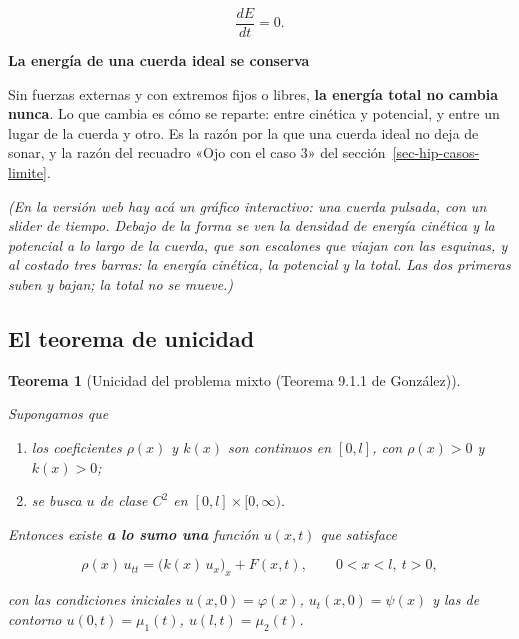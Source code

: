 \documentclass[
  spanish,
  a4paper,
]{scrbook}
\providecommand{\tightlist}{%
  \setlength{\itemsep}{0pt}\setlength{\parskip}{0pt}}
\theoremstyle{definition}
\theoremstyle{plain}
\theoremstyle{definition}
\theoremstyle{plain}
\newtheorem{theorem}{Teorema}[chapter]
\theoremstyle{definition}
\theoremstyle{remark}
\begin{document}
\[
\frac{dE}{dt} = 0 .
\]

\begin{tcolorbox}[enhanced jigsaw, arc=.35mm, bottomrule=.15mm, breakable, colback=white, colframe=quarto-callout-important-color-frame, left=2mm, leftrule=.75mm, opacityback=0, rightrule=.15mm, toprule=.15mm]
\begin{minipage}[t]{5.5mm}
\textcolor{quarto-callout-important-color}{\faExclamation}
\end{minipage}%
\begin{minipage}[t]{\textwidth - 5.5mm}

\vspace{-3mm}\textbf{La energía de una cuerda ideal se conserva}\vspace{3mm}

Sin fuerzas externas y con extremos fijos o libres, \textbf{la energía
total no cambia nunca}. Lo que cambia es cómo se reparte: entre cinética
y potencial, y entre un lugar de la cuerda y otro. Es la razón por la
que una cuerda ideal no deja de sonar, y la razón del recuadro «Ojo con
el caso 3» del sección~\ref{sec-hip-casos-limite}.

\end{minipage}%
\end{tcolorbox}

\emph{(En la versión web hay acá un gráfico interactivo: una cuerda
pulsada, con un slider de tiempo. Debajo de la forma se ven la densidad
de energía cinética y la potencial a lo largo de la cuerda, que son
escalones que viajan con las esquinas, y al costado tres barras: la
energía cinética, la potencial y la total. Las dos primeras suben y
bajan; la total no se mueve.)}

\subsection{El teorema de unicidad}\label{sec-hip-unicidad}

\begin{theorem}[Unicidad del problema mixto (Teorema 9.1.1 de
González)]\protect\hypertarget{thm-hip-unicidad}{}\label{thm-hip-unicidad}

Supongamos que

\begin{enumerate}
\def\labelenumi{\arabic{enumi}.}
\tightlist
\item
  los coeficientes \(\rho(x)\) y \(k(x)\) son continuos en \([0,l]\),
  con \(\rho(x)>0\) y \(k(x)>0\);
\item
  se busca \(u\) de clase \(C^2\) en \([0,l]\times[0,\infty)\).
\end{enumerate}

Entonces existe \textbf{a lo sumo una} función \(u(x,t)\) que satisface

\[
\rho(x)\,u_{tt} = \big(k(x)\,u_x\big)_x + F(x,t), \qquad 0<x<l,\ t>0,
\]

con las condiciones iniciales \(u(x,0) = \varphi(x)\),
\(u_t(x,0) = \psi(x)\) y las de contorno \(u(0,t) = \mu_1(t)\),
\(u(l,t) = \mu_2(t)\).

\end{theorem}
\end{document}
